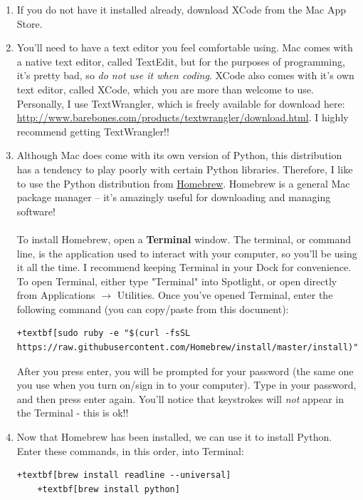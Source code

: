 \documentclass{article}
\begin{document}
\begin{enumerate}
	\item If you do not have it installed already, download XCode from the Mac App Store.
	
	\item You'll need to have a text editor you feel comfortable using. Mac comes with a native text editor, called TextEdit, but for the purposes of programming, it's pretty bad, so \emph{do not use it when coding}. XCode also comes with it's own text editor, called XCode, which you are more than welcome to use. Personally, I use TextWrangler, which is freely available for download here: \\ \href{http://www.barebones.com/products/textwrangler/download.html}{http://www.barebones.com/products/textwrangler/download.html}. I highly recommend getting TextWrangler!!
	
	\item Although Mac does come with its own version of Python, this distribution has a tendency to play poorly with certain Python libraries. Therefore, I like to use the Python distribution from \href{https://brew.sh}{Homebrew}. Homebrew is a general Mac package manager -- it's amazingly useful for downloading and managing software! 
	\\\\
	To install Homebrew, open a \textbf{Terminal} window. The terminal, or command line, is the application used to interact with your computer, so you'll be using it all the time. I recommend keeping Terminal in your Dock for convenience. To open Terminal, either type "Terminal" into Spotlight, or open directly from Applications $\rightarrow$ Utilities. Once you've opened Terminal, enter the following command (you can copy/paste from this document):
	\begin{Verbatim}[fontsize=\small,xleftmargin=-2.5cm,commandchars=+\[\]]
		+textbf[sudo ruby -e "$(curl -fsSL https://raw.githubusercontent.com/Homebrew/install/master/install)"]
	\end{Verbatim}
	After you press enter, you will be prompted for your password (the same one you use when you turn on/sign in to your computer). Type in your password, and then press enter again. You'll notice that keystrokes will \emph{not} appear in the Terminal - this is ok!!
	
	\item Now that Homebrew has been installed, we can use it to install Python. Enter these commands, in this order, into Terminal: 
	\begin{Verbatim}[fontsize=\small,xleftmargin=-0.95cm,commandchars=+\[\]]
	+textbf[brew install readline --universal]
	+textbf[brew install python]
	\end{Verbatim}
	

\end{enumerate}
\end{document}
